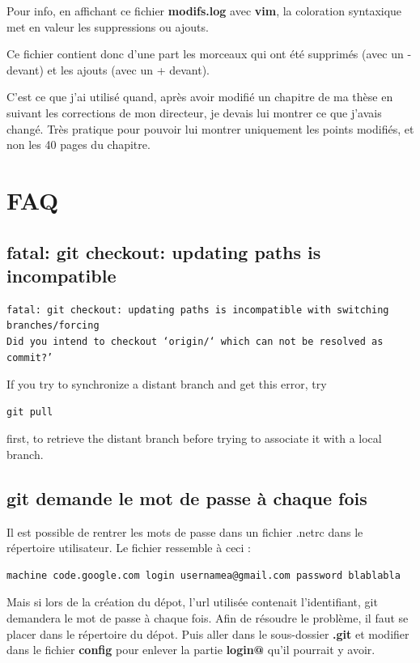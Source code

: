 \documentclass[a4paper,twoside]{article}
\begin{document}
Pour info, en affichant ce fichier \textbf{modifs.log} avec \textbf{vim}, la coloration syntaxique met en valeur les suppressions ou ajouts.

Ce fichier contient donc d'une part les morceaux qui ont été supprimés (avec un \og-\fg devant) et les ajouts (avec un \og + \fg devant). 

\begin{remarque}
C'est ce que j'ai utilisé quand, après avoir modifié un chapitre de ma thèse en suivant les corrections de mon directeur, je devais lui montrer ce que j'avais changé. Très pratique pour pouvoir lui montrer uniquement les points modifiés, et non les 40 pages du chapitre.
\end{remarque}


\section{FAQ}
\subsection{fatal: git checkout: updating paths is incompatible}
\begin{verbatim}
fatal: git checkout: updating paths is incompatible with switching branches/forcing
Did you intend to checkout ‘origin/‘ which can not be resolved as commit?’
\end{verbatim}

If you try to synchronize a distant branch and get this error, try
\begin{verbatim}
git pull
\end{verbatim}
first, to retrieve the distant branch before trying to associate it with a local branch. 


\subsection{git demande le mot de passe à chaque fois}
Il est possible de rentrer les mots de passe dans un fichier .netrc dans le répertoire utilisateur. Le fichier ressemble à ceci :
\begin{verbatim}
machine code.google.com login usernamea@gmail.com password blablabla
\end{verbatim}

Mais si lors de la création du dépot, l'url utilisée contenait l'identifiant, git demandera le mot de passe à chaque fois. Afin de résoudre le problème, il faut se placer dans le répertoire du dépot. Puis aller dans le sous-dossier \textbf{.git} et modifier dans le fichier \textbf{config} pour enlever la partie \textbf{login@} qu'il pourrait y avoir.

\printindex
\end{document}
